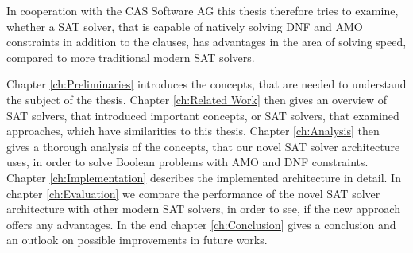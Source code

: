In cooperation with the CAS Software AG this thesis therefore tries to examine, whether a SAT solver, that is capable of natively solving DNF and AMO constraints in addition to the clauses, has advantages in the area of solving speed, compared to more traditional modern SAT solvers.

Chapter \ref{ch:Preliminaries} introduces the concepts, that are needed to understand the subject of the thesis. Chapter \ref{ch:Related Work} then gives an overview of SAT solvers, that introduced important concepts, or SAT solvers, that examined approaches, which have similarities to this thesis. Chapter \ref{ch:Analysis} then gives a thorough analysis of the concepts, that our novel SAT solver architecture uses, in order to solve Boolean problems with AMO and DNF constraints. Chapter \ref{ch:Implementation} describes the implemented architecture in detail. In chapter \ref{ch:Evaluation} we compare the performance of the novel SAT solver architecture with other modern SAT solvers, in order to see, if the new approach offers any advantages. In the end chapter \ref{ch:Conclusion} gives a conclusion and an outlook on possible improvements in future works.

